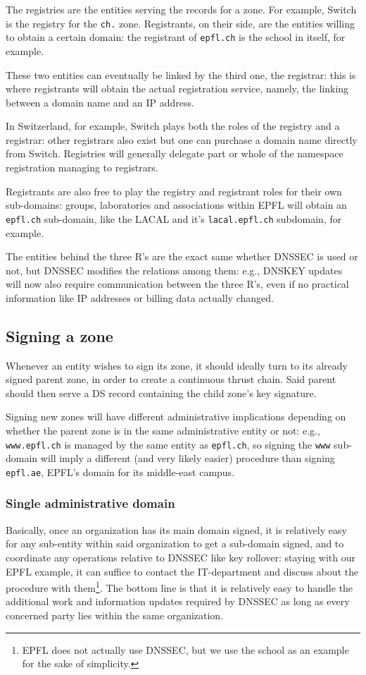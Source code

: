 \documentclass[a4paper,twocolumn]{scrartcl}
\begin{document}
The registries are the entities serving the records for a zone. For example, Switch is the registry for the \verb|ch.| zone. Registrants, on their side, are the entities willing to obtain a certain domain: the registrant of \verb|epfl.ch| is the school in itself, for example.

These two entities can eventually be linked by the third one, the registrar: this is where registrants will obtain the actual registration service, namely, the linking between a domain name and an IP address.

In Switzerland, for example, Switch plays both the roles of the registry and a registrar: other registrars also exist but one can purchase a domain name directly from Switch. Registries will generally delegate part or whole of the namespace registration managing to registrars.

Registrants are also free to play the registry and registrant roles for their own sub-domains: groups, laboratories and associations within EPFL will obtain an \verb|epfl.ch| sub-domain, like the LACAL and it's \verb|lacal.epfl.ch| subdomain, for example.

The entities behind the three R's are the exact same whether DNSSEC is used or not, but DNSSEC modifies the relations among them: e.g., DNSKEY updates will now also require communication between the three R's, even if no practical information like IP addresses or billing data actually changed.

\subsection{Signing a zone}
Whenever an entity wishes to sign its zone, it should ideally turn to its already signed parent zone, in order to create a continuous thrust chain.
Said parent should then serve a DS record containing the child zone's key signature.

Signing new zones will have different administrative implications depending on whether the parent zone is in the same administrative entity or not: e.g., \verb|www.epfl.ch| is managed by the same entity as \verb|epfl.ch|, so signing the \verb|www| sub-domain will imply a different (and very likely easier) procedure than signing \verb|epfl.ae|, EPFL's domain for its middle-east campus.

\subsubsection{Single administrative domain}
Basically, once an organization has its main domain signed, it is relatively easy for any sub-entity within said organization to get a sub-domain signed, and to coordinate any operations relative to DNSSEC like key rollover: staying with our EPFL example, it can suffice to contact the IT-department and discuss about the procedure with them\footnote{EPFL does not actually use DNSSEC, but we use the school as an example for the sake of simplicity.}. The bottom line is that it is relatively easy to handle the additional work and information updates required by DNSSEC as long as every concerned party lies within the same organization.
\end{document}
